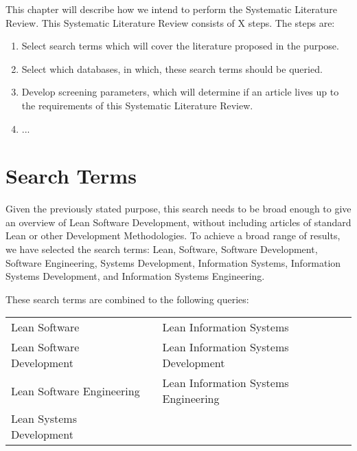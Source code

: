 This chapter will describe how we intend to perform the Systematic Literature Review.
This Systematic Literature Review consists of X steps. The steps are:
\begin{enumerate}
	\item Select search terms which will cover the literature proposed in the purpose.
	\item Select which databases, in which, these search terms should be queried.
	\item Develop screening parameters, which will determine if an article lives up to the requirements of this Systematic Literature Review.
	\item ...
\end{enumerate} 

\section{Search Terms}
Given the previously stated purpose, this search needs to be broad enough to give an overview of Lean Software Development, without including articles of standard Lean or other Development Methodologies.  
To achieve a broad range of results, we have selected the search terms: 
Lean, 
Software, 
Software Development, 
Software Engineering, 
Systems Development, 
Information Systems, 
Information Systems Development, 
and Information Systems Engineering.

These search terms are combined to the following queries:
\begin{table}[H]
	\centering
	\begin{tabular}{ l c l }
		\tabitem Lean Software  & \hspace{1cm} & \tabitem Lean Information Systems \\ 
		\tabitem Lean Software Development & \hspace{1cm} & \tabitem Lean Information Systems Development\\ 
		\tabitem Lean Software Engineering & \hspace{1cm} & \tabitem Lean Information Systems Engineering\\ 
		\tabitem Lean Systems Development & \hspace{1cm} & \\  
	\end{tabular}
\end{table} 

